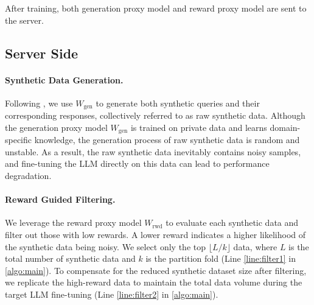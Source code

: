 After training, both generation proxy model and reward proxy model are sent to the server. 


\subsection{Server Side}
\label{sec:Method_P2}

\paragraph{Synthetic Data Generation.}
Following \citet{dayu2024privacy, Wang2024KnowledgeSGPS}, we use $W_\text{gen}$ to generate both synthetic queries and their corresponding responses, collectively referred to as raw synthetic data. 
Although the generation proxy model $W_\text{gen}$ is trained on private data and learns domain-specific knowledge, the generation process of raw synthetic data is random and unstable. 
As a result, the raw synthetic data inevitably contains noisy samples, and fine-tuning the LLM directly on this data can lead to performance degradation. 


\paragraph{Reward Guided Filtering.}
We leverage the reward proxy model $W_\text{rwd}$ to evaluate each synthetic data and filter out those with low rewards.
A lower reward indicates a higher likelihood of the synthetic data being noisy. 
We select only the top $\lfloor L/k \rfloor$ data, where $L$ is the total number of synthetic data and $k$ is the partition fold (Line \ref{line:filter1} in \cref{algo:main}).
To compensate for the reduced synthetic dataset size after filtering, we replicate the high-reward data to maintain the total data volume during the target LLM fine-tuning (Line \ref{line:filter2} in \cref{algo:main}). 


